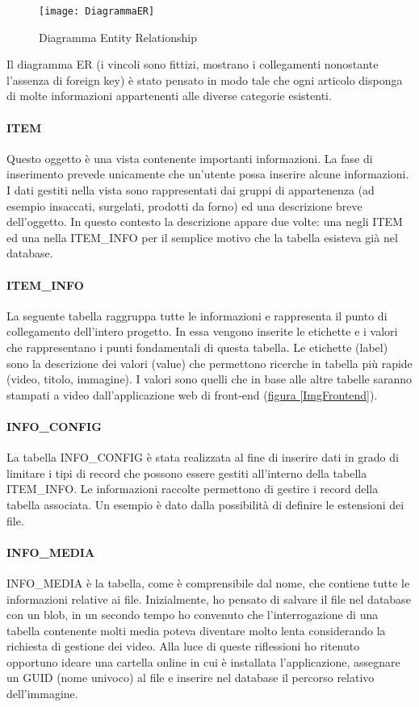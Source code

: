 \begin{figure}[!h] 
	\centering 
	\texttt{[image: DiagrammaER]} 
	\caption{Diagramma Entity Relationship}
	\label{DiagrammaER}
\end{figure}

Il diagramma ER (i vincoli sono fittizi, mostrano i collegamenti nonostante l'assenza di foreign key) è stato pensato in modo tale che ogni articolo disponga di molte informazioni appartenenti alle diverse categorie esistenti.

\paragraph{ITEM}
Questo oggetto è una vista contenente importanti informazioni. La fase di inserimento prevede unicamente che un'utente possa inserire alcune informazioni. I dati gestiti nella vista sono rappresentati dai gruppi di appartenenza (ad esempio insaccati, surgelati, prodotti da forno) ed una descrizione breve dell'oggetto.
In questo contesto la descrizione appare due volte: una negli ITEM ed una nella ITEM\_INFO per il semplice motivo che la tabella esisteva già nel database.

\paragraph{ITEM\_INFO}
La seguente tabella raggruppa tutte le informazioni e rappresenta il punto di collegamento dell'intero progetto. In essa vengono inserite le etichette e i valori che rappresentano i punti fondamentali di questa tabella. Le etichette (label) sono la descrizione dei valori (value) che permettono ricerche in tabella più rapide (video, titolo, immagine). I valori sono quelli che in base alle altre tabelle saranno stampati a video dall'applicazione web di front-end (\hyperref[ImgFrontend]{figura \ref{ImgFrontend}}).

\paragraph{INFO\_CONFIG}
La tabella INFO\_CONFIG è stata realizzata al fine di inserire dati in grado di limitare i tipi di record che possono essere gestiti all'interno della tabella ITEM\_INFO. Le informazioni raccolte permettono di gestire i record della tabella associata. Un esempio è dato dalla possibilità di definire le estensioni dei file.

\paragraph{INFO\_MEDIA}
INFO\_MEDIA è la tabella, come è comprensibile dal nome, che contiene tutte le informazioni relative ai file. Inizialmente, ho pensato di salvare il file nel database con un blob, in un secondo tempo ho convenuto che l'interrogazione di una tabella contenente molti media poteva diventare molto lenta considerando la richiesta di gestione dei video. Alla luce di queste riflessioni ho ritenuto opportuno ideare una cartella online in cui è installata l'applicazione, assegnare un GUID (nome univoco) al file e inserire nel database il percorso relativo dell'immagine.

